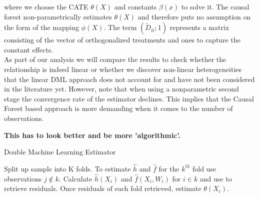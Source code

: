 where we choose the CATE $\theta(X)$ and constants $\beta(x)$ to solve it. The causal forest non-parametrically estimates $\theta(X)$ and therefore puts no assumption on the form of the mapping $\phi(X)$. The term $(\tilde{D}_{it}; 1)$ represents a matrix consisting of the vector of orthogonalized treatments and ones to capture the constant effects. \\
As part of our analysis we will compare the results to check whether the relationship is indeed linear or whether we discover non-linear heterogeneities that the linear DML approach does not account for and have not been considered in the literature yet. However, note that when using a nonparametric second stage the convergence rate of the estimator declines. This implies that the Causal Forest based approach is more demanding when it comes to the number of observations. 

\textbf{This has to look better and be more 'algorithmic'.}
\begin{algorithm} 
    \caption{Double Machine Learning Estimator}
    \label{alg:alg1}
    \begin{algorithmic}[1]
        \State Split up sample into K folds. 
        \State To estimate $\widehat{h}$ and $\widehat{f}$ for the $k^{th}$ fold use observations $j \notin k$. 
        \State Calculate $\widehat{h}(X_i)$ and $\widehat{f}(X_i, W_i)$ for $i \in k$ and use to retrieve residuals.
        \State Once residuals of each fold retrieved, estimate $\theta(X_i)$.
    \end{algorithmic}
\end{algorithm}